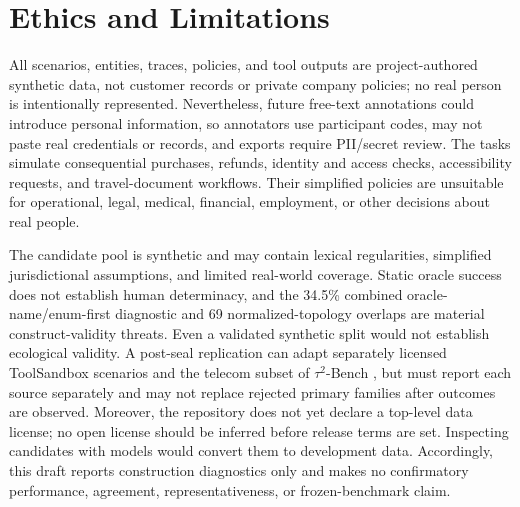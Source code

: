 \section{Ethics and Limitations}
\label{sec:ethics-limitations}

All scenarios, entities, traces, policies, and tool outputs are project-authored
synthetic data, not customer records or private company policies; no real person
is intentionally represented.  Nevertheless, future free-text annotations could
introduce personal information, so annotators use participant codes, may not paste
real credentials or records, and exports require PII/secret review.  The tasks
simulate consequential purchases, refunds, identity and access checks,
accessibility requests, and travel-document workflows.  Their simplified policies
are unsuitable for operational, legal, medical, financial, employment, or other
decisions about real people.

The candidate pool is synthetic and may contain lexical regularities, simplified
jurisdictional assumptions, and limited real-world coverage.  Static oracle
success does not establish human determinacy, and the 34.5\% combined
oracle-name/enum-first diagnostic and 69 normalized-topology overlaps are
material construct-validity threats.
Even a validated synthetic split would not establish ecological validity.  A
post-seal replication can adapt separately licensed ToolSandbox scenarios and
the telecom subset of $\tau^2$-Bench \citep{lu2025toolsandbox,barres2025tau2},
but must report each source separately and may not replace rejected primary
families after outcomes are observed.
Moreover, the repository does not yet declare a top-level data license; no open
license should be inferred before release terms are set.  Inspecting candidates
with models would convert them to development data.  Accordingly, this draft
reports construction diagnostics only and makes no confirmatory performance,
agreement, representativeness, or frozen-benchmark claim.
